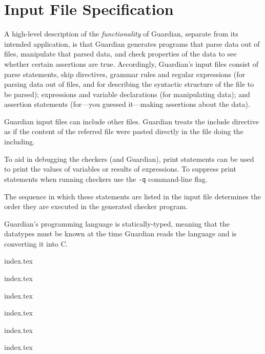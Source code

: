 
\chapter{Input File Specification}
{
	A high-level description of the \textit{functionality} of Guardian, separate
	from its intended application, is that Guardian generates programs that
	parse data out of files, manipulate that parsed data, and check
	properties of the data to see whether certain assertions are true.
	Accordingly, Guardian's input files
	consist of parse statements, skip directives, grammar rules and regular
	expressions (for
	parsing data out of files, and for describing the syntactic structure of
	the file to be parsed); expressions and variable declarations
	(for manipulating data); and assertion
	statements (for---you guessed it---making assertions about the data).
	
	Guardian input files can include other files. Guardian treats the
	include directive as if the content of the referred file were pasted
	directly in the file doing the including.
	
	To aid in debugging the checkers (and Guardian), print
	statements can be used to print the values of variables or
	results of expressions. To suppress print statements when running
	checkers use
	the \texttt{-q} command-line flag.
	
	The sequence in which these statements
	are listed in the input file determines the
	order they are executed in the generated checker program.
	
	Guardian's programming language is statically-typed, meaning that the
	datatypes
	must be known at the time Guardian reads the language and is
	converting it into C.
	
	{index.tex}
	
	{index.tex}
	
	{index.tex}
	
	{index.tex}
	
	{index.tex}
	
	{index.tex}
}










